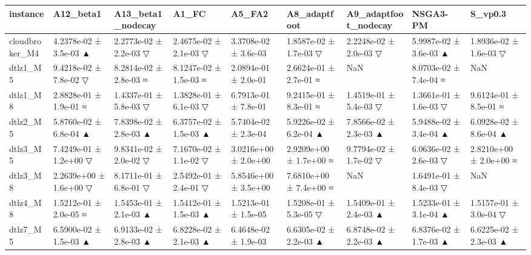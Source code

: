\begin{tabular}{lllllllll}
\toprule
instance & A12\_beta1 & A13\_beta1\_nodecay & A1\_FC & A5\_FA2 & A8\_adaptfoot & A9\_adaptfoot\_nodecay & NSGA3-PM & S\_vp0.3 \\
\midrule
cloudbroker\_M4 & 4.2378e-02 ± 3.5e-03 ▲ & 2.2773e-02 ± 2.2e-03 ▽ & 2.4675e-02 ± 2.1e-03 ▽ & 3.3708e-02 ± 3.6e-03 & 1.8587e-02 ± 1.7e-03 ▽ & 2.2248e-02 ± 2.0e-03 ▽ & 5.9987e-02 ± 3.6e-03 ▲ & 1.8936e-02 ± 1.6e-03 ▽ \\
dtlz1\_M5 & 9.4218e-02 ± 7.8e-02 ▽ & 8.2814e-02 ± 2.8e-03 ≈ & 8.1247e-02 ± 1.5e-03 ≈ & 2.0894e-01 ± 2.0e-01 & 2.6624e-01 ± 2.7e-01 ≈ & NaN & 8.0703e-02 ± 7.4e-04 ≈ & NaN \\
dtlz1\_M8 & 2.8828e-01 ± 1.9e-01 ≈ & 1.4337e-01 ± 5.8e-03 ▽ & 1.3828e-01 ± 6.1e-03 ▽ & 6.7913e-01 ± 7.8e-01 & 9.2415e-01 ± 8.3e-01 ≈ & 1.4519e-01 ± 5.4e-03 ▽ & 1.3661e-01 ± 1.6e-03 ▽ & 9.6124e-01 ± 8.5e-01 ≈ \\
dtlz2\_M5 & 5.8760e-02 ± 6.8e-04 ▲ & 7.8398e-02 ± 2.8e-03 ▲ & 6.3757e-02 ± 1.5e-03 ▲ & 5.7404e-02 ± 2.3e-04 & 5.9226e-02 ± 6.2e-04 ▲ & 7.8566e-02 ± 2.3e-03 ▲ & 5.9488e-02 ± 3.4e-04 ▲ & 6.0928e-02 ± 8.6e-04 ▲ \\
dtlz3\_M5 & 7.4249e-01 ± 1.2e+00 ▽ & 9.8341e-02 ± 2.0e-02 ▽ & 7.1670e-02 ± 1.1e-02 ▽ & 3.0216e+00 ± 2.0e+00 & 2.9209e+00 ± 1.7e+00 ≈ & 9.7794e-02 ± 1.7e-02 ▽ & 6.0636e-02 ± 2.6e-03 ▽ & 2.8210e+00 ± 2.0e+00 ≈ \\
dtlz3\_M8 & 2.2639e+00 ± 1.6e+00 ▽ & 8.1711e-01 ± 6.8e-01 ▽ & 2.5492e-01 ± 2.4e-01 ▽ & 5.8546e+00 ± 3.5e+00 & 7.6810e+00 ± 7.4e+00 ≈ & NaN & 1.6491e-01 ± 8.4e-03 ▽ & NaN \\
dtlz4\_M8 & 1.5212e-01 ± 2.0e-05 ≈ & 1.5453e-01 ± 2.1e-03 ▲ & 1.5412e-01 ± 1.5e-03 ▲ & 1.5213e-01 ± 1.5e-05 & 1.5208e-01 ± 5.3e-05 ▽ & 1.5409e-01 ± 2.4e-03 ▲ & 1.5233e-01 ± 3.1e-04 ▲ & 1.5157e-01 ± 3.0e-04 ▽ \\
dtlz7\_M5 & 6.5900e-02 ± 1.5e-03 ▲ & 6.9133e-02 ± 2.8e-03 ▲ & 6.8228e-02 ± 2.1e-03 ▲ & 6.4648e-02 ± 1.9e-03 & 6.6305e-02 ± 2.2e-03 ▲ & 6.8748e-02 ± 2.2e-03 ▲ & 6.8376e-02 ± 1.7e-03 ▲ & 6.6225e-02 ± 2.3e-03 ▲ \\
\bottomrule
\end{tabular}
